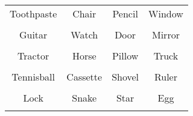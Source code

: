 \documentclass[12pt,a4paper]{article}
\begin{document}
\thispagestyle{empty}
\begin{table}[]
\centering
\Huge
\begin{tabular}{cccc}
 Toothpaste& Chair& Pencil& Window\\  & & & \\
 Guitar& Watch& Door& Mirror\\  & & & \\
 Tractor& Horse& Pillow& Truck\\  & & & \\
 Tennisball& Cassette& Shovel& Ruler\\  & & & \\
 Lock& Snake& Star& Egg\\  & & & \\
\end{tabular}
\end{table}
\end{document}
